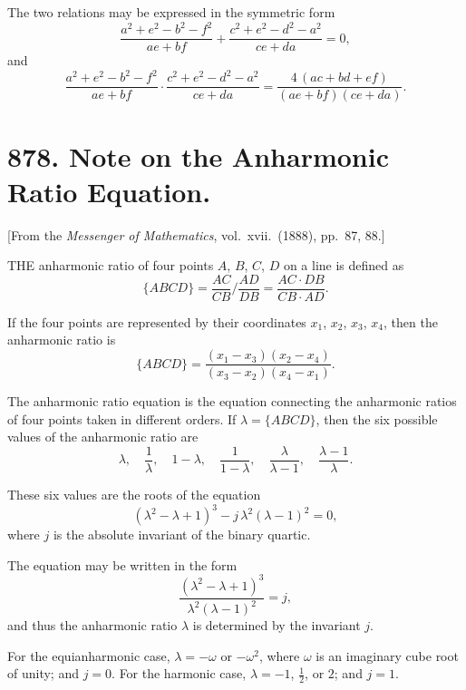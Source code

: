 \documentclass[11pt,a4paper]{book}
\begin{document}
\medskip\noindent
The two relations may be expressed in the symmetric form
\[
\frac{a^{2} + e^{2} - b^{2} - f^{2}}{ae + bf} + \frac{c^{2} + e^{2} - d^{2} - a^{2}}{ce + da} = 0,
\]
and
\[
\frac{a^{2} + e^{2} - b^{2} - f^{2}}{ae + bf} \cdot \frac{c^{2} + e^{2} - d^{2} - a^{2}}{ce + da} = \frac{4\,(ac + bd + ef)}{(ae + bf)(ce + da)}.
\]

\newpage
\section[878]{878. Note on the Anharmonic Ratio Equation.}
\label{sec:878}

[From the \textit{Messenger of Mathematics}, vol.\ xvii.\ (1888), pp.\ 87, 88.]

\medskip\noindent
THE anharmonic ratio of four points $A$, $B$, $C$, $D$ on a line is defined as
\[
\{ABCD\} = \frac{AC}{CB} \bigg/ \frac{AD}{DB} = \frac{AC \cdot DB}{CB \cdot AD}.
\]

If the four points are represented by their coordinates $x_{1}$, $x_{2}$, $x_{3}$, $x_{4}$, then the anharmonic ratio is
\[
\{ABCD\} = \frac{(x_{1} - x_{3})(x_{2} - x_{4})}{(x_{3} - x_{2})(x_{4} - x_{1})}.
\]

The anharmonic ratio equation is the equation connecting the anharmonic ratios of four points taken in different orders. If $\lambda = \{ABCD\}$, then the six possible values of the anharmonic ratio are
\[
\lambda, \quad \frac{1}{\lambda}, \quad 1 - \lambda, \quad \frac{1}{1 - \lambda}, \quad \frac{\lambda}{\lambda - 1}, \quad \frac{\lambda - 1}{\lambda}.
\]

These six values are the roots of the equation
\[
(\lambda^{2} - \lambda + 1)^{3} - j\,\lambda^{2}(\lambda - 1)^{2} = 0,
\]
where $j$ is the absolute invariant of the binary quartic.

\medskip\noindent
The equation may be written in the form
\[
\frac{(\lambda^{2} - \lambda + 1)^{3}}{\lambda^{2}(\lambda - 1)^{2}} = j,
\]
and thus the anharmonic ratio $\lambda$ is determined by the invariant $j$.

\medskip\noindent
For the equianharmonic case, $\lambda = -\omega$ or $-\omega^{2}$, where $\omega$ is an imaginary cube root of unity; and $j = 0$. For the harmonic case, $\lambda = -1$, $\tfrac{1}{2}$, or $2$; and $j = 1$.

\newpage
\end{document}
